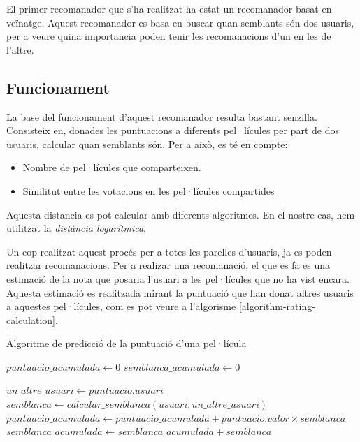 El primer recomanador que s'ha realitzat ha estat un recomanador basat en veïnatge. Aquest recomanador es basa en buscar quan semblants són dos usuaris, per a veure quina importancia poden tenir les recomanacions d'un en les de l'altre.

\subsection{Funcionament}

La base del funcionament d'aquest recomanador resulta bastant senzilla. Consisteix en, donades les puntuacions a diferents pel·lícules per part de dos usuaris, calcular quan semblants són. Per a això, es té en compte:

\begin{itemize}
	\item Nombre de pel·lícules que comparteixen.
	\item Similitut entre les votacions en les pel·lícules compartides
\end{itemize}

Aquesta distancia es pot calcular amb diferents algoritmes. En el nostre cas, hem utilitzat la \emph{distància logarítmica}.

Un cop realitzat aquest procés per a totes les parelles d'usuaris, ja es poden realitzar recomanacions. Per a realizar una recomanació, el que es fa es una estimació de la nota que posaria l'usuari a les pel·lícules que no ha vist encara. Aquesta estimació es realitzada mirant la puntuació que han donat altres usuaris a aquestes pel·lícules, com es pot veure a l'algorisme \ref{algorithm-rating-calculation}.

\begin{algorithm}
\caption{Algoritme de predicció de la puntuació d'una pel·lícula}
\label{algorithm-rating-calculation}
\begin{algorithmic}
\State $puntuacio\_acumulada \gets 0$
\State $semblanca\_acumulada \gets 0$

	\State $un\_altre\_usuari \gets puntuacio.usuari$
	\State $semblanca \gets calcular\_semblanca(usuari, un\_altre\_usuari)$
	\State $puntuacio\_acumulada \gets puntuacio\_acumulada + puntuacio.valor \times semblanca$
	\State $semblanca\_acumulada \gets semblanca\_acumulada + semblanca$
\EndFor

\end{algorithmic}
\end{algorithm}

